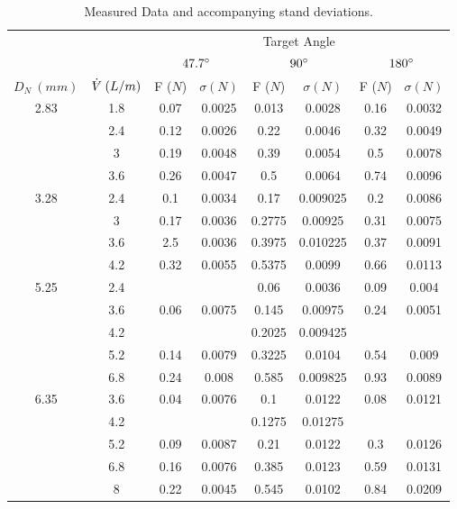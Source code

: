 \documentclass[11pt]{article}
\newcommand{\dgr}{\boldmath\ensuremath{{}^\circ}\unboldmath}
\newcommand{\vlm}{V \!\!\!\!\!\!\: \rule[0.07in]{.095in}{.0025in}}
\begin{document}
\begin{table}[]
    \centering
    \caption{Measured Data and accompanying stand deviations.}
    \begin{tabular}{@{}cccccccc@{}}\toprule
    && \multicolumn{6}{c}{Target Angle}\\   \cmidrule{3-8}
    && \multicolumn{2}{c}{$47.7\dgr$} & \multicolumn{2}{c}{$90\dgr$} & \multicolumn{2}{c}{$180\dgr$}\\
    \cmidrule{3-4}  \cmidrule{5-6}  \cmidrule{7-8}
    $D_N \ (mm)$ & $\dot\vlm \ (L/m)$ & F ($N$) & $\sigma (N)$ & F ($N$) & $\sigma (N)$ & F ($N$) & $\sigma (N)$\\  \midrule
    \multirow{4}{*}{2.83} & 1.8 & 0.07 & 0.0025 & 0.013 & 0.0028 & 0.16 & 0.0032\\
    & 2.4 & 0.12 & 0.0026 & 0.22 & 0.0046 & 0.32 & 0.0049\\
    & 3 & 0.19 & 0.0048 & 0.39 & 0.0054 & 0.5 & 0.0078\\
    & 3.6 & 0.26 & 0.0047 & 0.5 & 0.0064 & 0.74 & 0.0096\\  \midrule
    \multirow{4}{*}{3.28} & 2.4 & 0.1 & 0.0034 & 0.17 & 0.009025 & 0.2 & 0.0086\\
    & 3 & 0.17 & 0.0036 & 0.2775 & 0.00925 & 0.31 & 0.0075\\
    & 3.6 & 2.5 & 0.0036 & 0.3975 & 0.010225 & 0.37 & 0.0091\\
    & 4.2 & 0.32 & 0.0055 & 0.5375 & 0.0099 & 0.66 & 0.0113\\   \midrule
    \multirow{5}{*}{5.25} & 2.4 &&& 0.06 & 0.0036 & 0.09 & 0.004\\
    & 3.6 & 0.06 & 0.0075 & 0.145 & 0.00975 & 0.24 & 0.0051\\
    & 4.2 &&& 0.2025 & 0.009425 &&\\
    & 5.2 & 0.14 & 0.0079 & 0.3225 & 0.0104 & 0.54 & 0.009\\
    & 6.8 & 0.24 & 0.008 & 0.585 & 0.009825 & 0.93 & 0.0089\\   \midrule
    \multirow{5}{*}{6.35} & 3.6 & 0.04 & 0.0076 & 0.1 & 0.0122 & 0.08 & 0.0121\\
    & 4.2 &&& 0.1275 & 0.01275 &&\\
    & 5.2 & 0.09 & 0.0087 & 0.21 & 0.0122 & 0.3 & 0.0126\\
    & 6.8 & 0.16 & 0.0076 & 0.385 & 0.0123 & 0.59 & 0.0131\\
    & 8 & 0.22 & 0.0045 & 0.545 & 0.0102 & 0.84 & 0.0209\\
    \bottomrule
    \end{tabular}
    \label{data}
\end{table}
\end{document}
